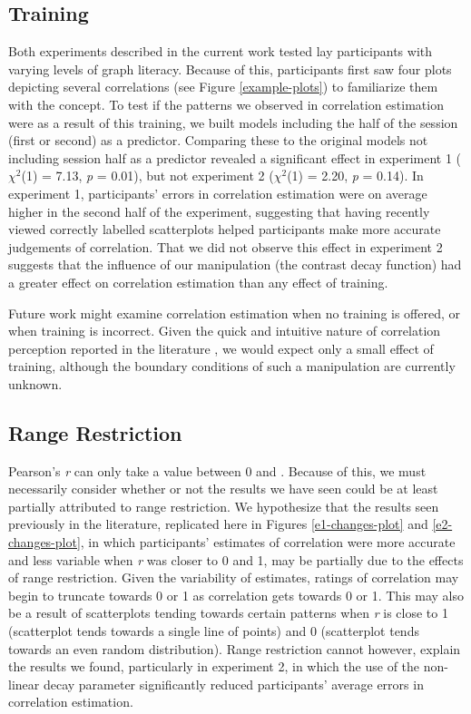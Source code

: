 \documentclass[preprint, 3p,
authoryear]{elsarticle} %
\begin{document}
\hypertarget{training}{%
\subsection{Training}\label{training}}

Both experiments described in the current work tested lay participants
with varying levels of graph literacy. Because of this, participants
first saw four plots depicting several correlations (see Figure
\ref{example-plots}) to familiarize them with the concept. To test if
the patterns we observed in correlation estimation were as a result of
this training, we built models including the half of the session (first
or second) as a predictor. Comparing these to the original models not
including session half as a predictor revealed a significant effect in
experiment 1 (\(\chi^2\)(1) = 7.13, \emph{p} = 0.01), but not experiment
2 (\(\chi^2\)(1) = 2.20, \emph{p} = 0.14). In experiment 1,
participants' errors in correlation estimation were on average higher in
the second half of the experiment, suggesting that having recently
viewed correctly labelled scatterplots helped participants make more
accurate judgements of correlation. That we did not observe this effect
in experiment 2 suggests that the influence of our manipulation (the
contrast decay function) had a greater effect on correlation estimation
than any effect of training.

Future work might examine correlation estimation when no training is
offered, or when training is incorrect. Given the quick and intuitive
nature of correlation perception reported in the literature
\citep{rensink_2014}, we would expect only a small effect of training,
although the boundary conditions of such a manipulation are currently
unknown.

\hypertarget{range-restriction}{%
\subsection{Range Restriction}\label{range-restriction}}

Pearson's \emph{r} can only take a value between 0 and
\textbar. Because of this, we must necessarily consider whether
or not the results we have seen could be at least partially attributed
to range restriction. We hypothesize that the results seen previously in
the literature, replicated here in Figures \ref{e1-changes-plot} and
\ref{e2-changes-plot}, in which participants' estimates of correlation
were more accurate and less variable when \emph{r} was closer to 0 and
1, may be partially due to the effects of range restriction. Given the
variability of estimates, ratings of correlation may begin to truncate
towards 0 or 1 as correlation gets towards 0 or 1. This may also be a
result of scatterplots tending towards certain patterns when \emph{r} is
close to 1 (scatterplot tends towards a single line of points) and 0
(scatterplot tends towards an even random distribution). Range
restriction cannot however, explain the results we found, particularly
in experiment 2, in which the use of the non-linear decay parameter
significantly reduced participants' average errors in correlation
estimation.
\end{document}
